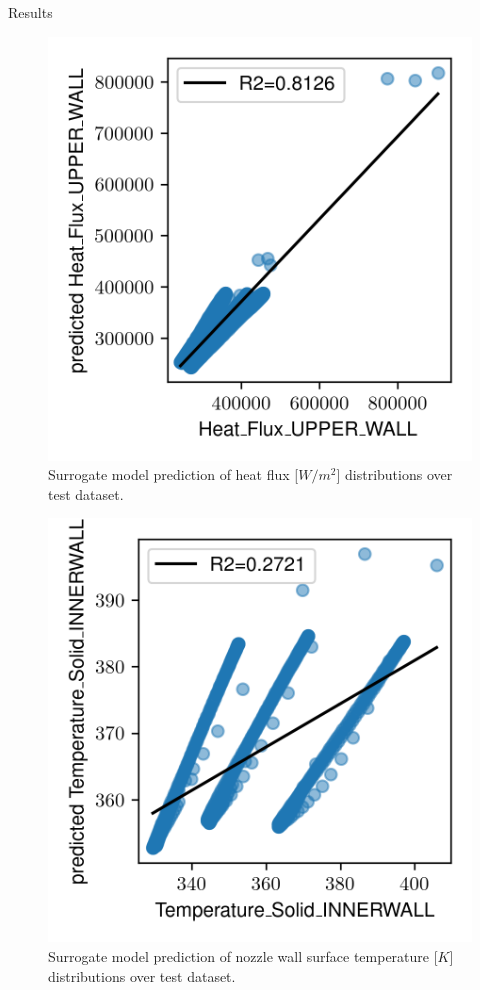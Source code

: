 \begin{frame}{Results}
\begin{figure}
\hypertarget{fig:r2_heat_flux}{%
\centering
\includegraphics{figures/results/Heat_Flux_UPPER_WALL.png}
\caption{Surrogate model prediction of heat flux {[}\(W/m^2\){]}
distributions over test dataset.}\label{fig:r2_heat_flux}
}
\end{figure}

\begin{figure}
\hypertarget{fig:r2_temperature_solid_wall}{%
\centering
\includegraphics{figures/results/Temperature_Solid_INNERWALL.png}
\caption{Surrogate model prediction of nozzle wall surface temperature
{[}\(K\){]} distributions over test
dataset.}\label{fig:r2_temperature_solid_wall}
}
\end{figure}


\end{frame}
